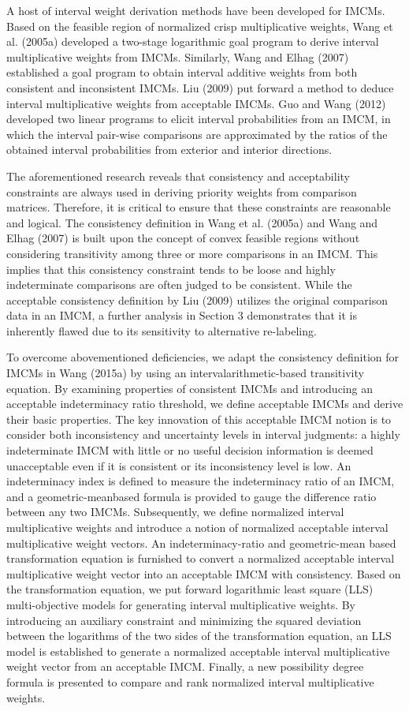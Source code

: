 \documentclass[10pt]{article}
\begin{document}
A host of interval weight derivation methods have been developed for IMCMs. Based on the feasible region of normalized crisp multiplicative weights, Wang et al. (2005a) developed a two-stage logarithmic goal program to derive interval multiplicative weights from IMCMs. Similarly, Wang and Elhag (2007) established a goal program to obtain interval additive weights from both consistent and inconsistent IMCMs. Liu (2009) put forward a method to deduce interval multiplicative weights from acceptable IMCMs. Guo and Wang (2012) developed two linear programs to elicit interval probabilities from an IMCM, in which the interval pair-wise comparisons are approximated by the ratios of the obtained interval probabilities from exterior and interior directions.

The aforementioned research reveals that consistency and acceptability constraints are always used in deriving priority weights from comparison matrices. Therefore, it is critical to ensure that these constraints are reasonable and logical. The consistency definition in Wang et al. (2005a) and Wang and Elhag (2007) is built upon the concept of convex feasible regions without considering transitivity among three or more comparisons in an IMCM. This implies that this consistency constraint tends to be loose and highly indeterminate comparisons are often judged to be consistent. While the acceptable consistency definition by Liu (2009) utilizes the original comparison data in an IMCM, a further analysis in Section 3 demonstrates that it is inherently flawed due to its sensitivity to alternative re-labeling.

To overcome abovementioned deficiencies, we adapt the consistency definition for IMCMs in Wang (2015a) by using an intervalarithmetic-based transitivity equation. By examining properties of consistent IMCMs and introducing an acceptable indeterminacy ratio threshold, we define acceptable IMCMs and derive their basic properties. The key innovation of this acceptable IMCM notion is to consider both inconsistency and uncertainty levels in interval judgments: a highly indeterminate IMCM with little or no useful decision information is deemed unacceptable even if it is consistent or its inconsistency level is low. An indeterminacy index is defined to measure the indeterminacy ratio of an IMCM, and a geometric-meanbased formula is provided to gauge the difference ratio between any two IMCMs. Subsequently, we define normalized interval multiplicative weights and introduce a notion of normalized acceptable interval multiplicative weight vectors. An indeterminacy-ratio and geometric-mean based transformation equation is furnished to convert a normalized acceptable interval multiplicative weight vector into an acceptable IMCM with consistency. Based on the transformation equation, we put forward logarithmic least square (LLS) multi-objective models for generating interval multiplicative weights. By introducing an auxiliary constraint and minimizing the squared deviation between the logarithms of the two sides of the transformation equation, an LLS model is established to generate a normalized acceptable interval multiplicative weight vector from an acceptable IMCM. Finally, a new possibility degree formula is presented to compare and rank normalized interval multiplicative weights.
\end{document}
